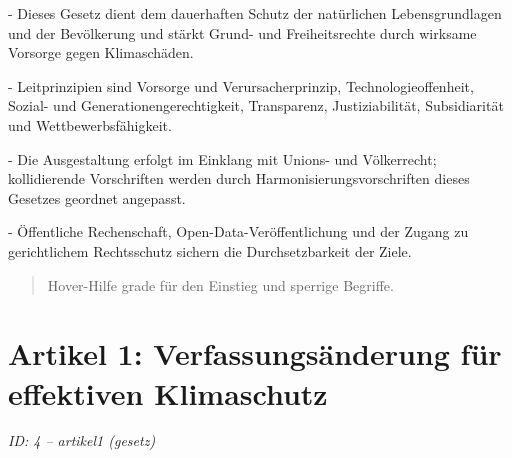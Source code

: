 \documentclass[12pt,a4paper]{scrartcl}
\begin{document}
- Dieses Gesetz dient dem dauerhaften Schutz der natürlichen Lebensgrundlagen und der Bevölkerung und stärkt Grund- und Freiheitsrechte durch wirksame Vorsorge gegen Klimaschäden.

- Leitprinzipien sind Vorsorge und Verursacherprinzip, Technologieoffenheit, Sozial- und Generationengerechtigkeit, Transparenz, Justiziabilität, Subsidiarität und Wettbewerbsfähigkeit.

- Die Ausgestaltung erfolgt im Einklang mit Unions- und Völkerrecht; kollidierende Vorschriften werden durch Harmonisierungsvorschriften dieses Gesetzes geordnet angepasst.

- Öffentliche Rechenschaft, Open-Data-Veröffentlichung und der Zugang zu gerichtlichem Rechtsschutz sichern die Durchsetzbarkeit der Ziele.

{\footnotesize\begin{quote}
Hover-Hilfe grade für den Einstieg und sperrige Begriffe.
\end{quote}}



\section[Artikel 1: Verfassungsänderung für effektiven Klimaschutz]{Artikel 1: Verfassungsänderung für effektiven Klimaschutz}
\noindent\textit{ID: 4 -- artikel1 (gesetz)}
\end{document}
